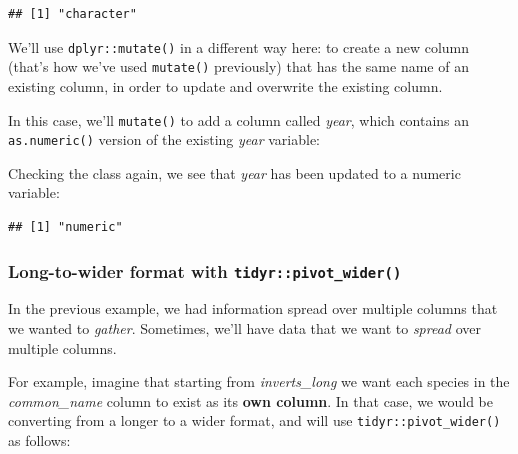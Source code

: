 \documentclass[]{book}
\newenvironment{Shaded}{\begin{snugshade}}{\end{snugshade}}
\newcommand{\CommentTok}[1]{\textcolor[rgb]{0.56,0.35,0.01}{\textit{#1}}}
\newcommand{\DataTypeTok}[1]{\textcolor[rgb]{0.13,0.29,0.53}{#1}}
\newcommand{\KeywordTok}[1]{\textcolor[rgb]{0.13,0.29,0.53}{\textbf{#1}}}
\newcommand{\NormalTok}[1]{#1}
\newcommand{\OperatorTok}[1]{\textcolor[rgb]{0.81,0.36,0.00}{\textbf{#1}}}
\newcommand{\StringTok}[1]{\textcolor[rgb]{0.31,0.60,0.02}{#1}}
\begin{document}
\begin{verbatim}
## [1] "character"
\end{verbatim}

We'll use \texttt{dplyr::mutate()} in a different way here: to create a new column (that's how we've used \texttt{mutate()} previously) that has the same name of an existing column, in order to update and overwrite the existing column.

In this case, we'll \texttt{mutate()} to add a column called \emph{year}, which contains an \texttt{as.numeric()} version of the existing \emph{year} variable:

\begin{Shaded}
\end{Shaded}

Checking the class again, we see that \emph{year} has been updated to a numeric variable:

\begin{Shaded}
\end{Shaded}

\begin{verbatim}
## [1] "numeric"
\end{verbatim}

\hypertarget{long-to-wider-format-with-tidyrpivot_wider}{%
\subsubsection{\texorpdfstring{Long-to-wider format with \texttt{tidyr::pivot\_wider()}}{Long-to-wider format with tidyr::pivot\_wider()}}\label{long-to-wider-format-with-tidyrpivot_wider}}

In the previous example, we had information spread over multiple columns that we wanted to \emph{gather}. Sometimes, we'll have data that we want to \emph{spread} over multiple columns.

For example, imagine that starting from \emph{inverts\_long} we want each species in the \emph{common\_name} column to exist as its \textbf{own column}. In that case, we would be converting from a longer to a wider format, and will use \texttt{tidyr::pivot\_wider()} as follows:
\end{document}
